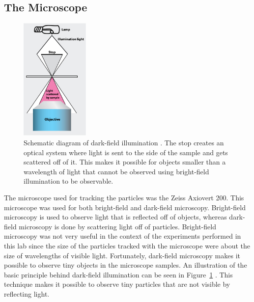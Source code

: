 \documentclass[11pt,letterpaper]{article}
\begin{document}
\subsection{The Microscope}

\begin{figure}
    \centering
    \includegraphics[width=0.3\textwidth]{figures/darkfield.jpg}
    \caption{Schematic diagram of dark-field illumination \cite{LabExp}. The
    stop creates an optical system where light is sent to the side of the sample
    and gets scattered off of it. This makes it possible for objects smaller
    than a wavelength of light that cannot be observed using bright-field
    illumination to be observable.}
    \label{darkfield}
\end{figure}

The microscope used for tracking the particles was the Zeiss Axiovert 200. This
microscope was used for both bright-field and dark-field microscopy.
Bright-field microscopy is used to observe light that is reflected off of
objects, whereas dark-field microscopy is done by scattering light off of
particles. Bright-field microscopy was not very useful in the context of the
experiments performed in this lab since the size of the particles tracked with
the microscope were about the size of wavelengths of visible light. Fortunately,
dark-field microscopy makes it possible to observe tiny objects in the
microscope samples. An illustration of the basic principle behind dark-field
illumination can be seen in Figure~\ref{darkfield} \cite{LabExp}. This technique
makes it possible to observe tiny particles that are not visible by reflecting
light.\\
\end{document}
